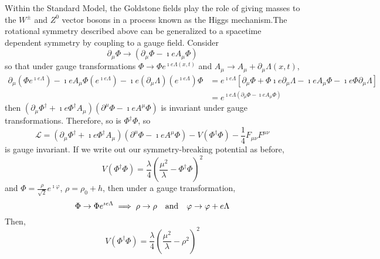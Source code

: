 \documentclass[a4paper,twoside,master.tex]{subfiles}
\begin{document}
Within the Standard Model, the Goldstone fields play the role of giving masses to the $ W^{\pm} $ and $ Z^0 $ vector bosons in a process known as the Higgs mechanism.The rotational symmetry described above can be generalized to a spacetime dependent symmetry by coupling to a gauge field. Consider
\begin{equation}
    \partial_{\mu} \Phi \to (\partial_{\mu} \Phi - \imath e A_{\mu} \Phi)
\end{equation}
so that under gauge transformations $ \Phi \to \Phi e^{\imath e \Lambda(x,t)} $ and $ A_{\mu} \to A_{\mu} + \partial_{\mu} \Lambda(x,t) $,
\begin{align}
    \partial_{\mu} (\Phi e^{\imath e \Lambda}) - \imath e A_{\mu} \Phi(e^{\imath e \Lambda}) - \imath e (\partial_{\mu} \Lambda)(e^{\imath e \Lambda}) \Phi &= e^{\imath e \Lambda} \left[ \partial_{\mu} \Phi + \Phi \imath e \partial_{\mu} \Lambda - \imath e A_{\mu} \Phi - \imath e \Phi \partial_{\mu} \Lambda \right] \\
                                                                                                                                                             &= e^{\imath e \Lambda \left( \partial_{\mu} \Phi - \imath e A_{\mu} \Phi \right)}
\end{align}
then $ (\partial_{\mu} \Phi^\dagger + \imath e \Phi^\dagger A_{\mu})(\partial^{\mu} \Phi - \imath e A^{\mu} \Phi) $ is invariant under gauge transformations. Therefore, so is $ \Phi^\dagger \Phi $, so
\begin{equation}
    \mathcal{L} = (\partial_{\mu} \Phi^\dagger + \imath e \Phi^\dagger A_{\mu})(\partial^{\mu} \Phi - \imath e A^{\mu} \Phi) - V(\Phi^\dagger \Phi) - \frac{1}{4} F_{\mu \nu} F^{\mu \nu}
\end{equation}
is gauge invariant. If we write out our symmetry-breaking potential as before,
\begin{equation}
    V(\Phi^\dagger \Phi) = \frac{\lambda}{4} \left( \frac{\mu^2}{\lambda} - \Phi^\dagger \Phi \right)^2
\end{equation}
and $ \Phi = \frac{\rho}{\sqrt{2}} e^{\imath \varphi} $, $ \rho = \rho_0 + h $, then under a gauge transformation,
\begin{equation}
    \Phi \to \Phi e^{\imath e \Lambda} \implies \rho \to \rho \qand \varphi \to \varphi + e \Lambda
\end{equation}
Then,
\begin{equation}
    V(\Phi^\dagger \Phi) = \frac{\lambda}{4} \left( \frac{\mu^2}{\lambda} - \rho^2 \right)^2
\end{equation}
\end{document}
